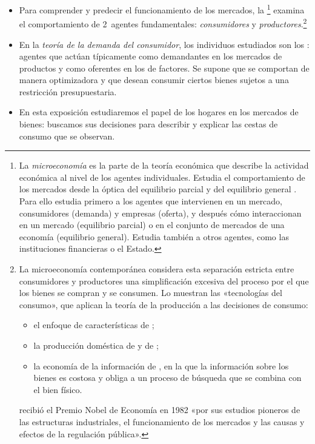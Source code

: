 \documentclass[11pt]{article}
\begin{document}
\begin{itemize}
\begin{itemize}
  \item Para comprender y predecir el funcionamiento de los mercados, la \footnote{La \emph{microeconomía} es la parte de la teoría económica que describe la actividad económica al nivel de los agentes individuales. Estudia el comportamiento de los mercados desde la óptica del equilibrio parcial  y del equilibrio general . Para ello estudia primero a los agentes que intervienen en un mercado, consumidores (demanda) y empresas (oferta), y después cómo interaccionan en un mercado (equilibrio parcial) o en el conjunto de mercados de una economía (equilibrio general). Estudia también a otros agentes, como las instituciones financieras o el Estado.} examina el comportamiento de 2~agentes fundamentales: \emph{consumidores} y \emph{productores}.\footnote{La microeconomía contemporánea considera esta separación estricta entre consumidores y productores una simplificación excesiva del proceso por el que los bienes se compran y se consumen\nocite{EkelundHebert2013History}. Lo muestran las «tecnologías del consumo», que aplican la teoría de la producción a las decisiones de consumo:
\begin{itemize}
\item el enfoque de características de \textcite{Lancaster1966New};
\item la producción doméstica de \textcite{Becker1965Allocation} y de \textcite{Gronau1977Leisure};
\item la economía de la información de \textcite{Stigler1961Information}, en la que la información sobre los bienes es costosa y obliga a un proceso de búsqueda que se combina con el bien físico.
\end{itemize}
 recibió el Premio Nobel de Economía en 1982 «por sus estudios pioneros de las estructuras industriales, el funcionamiento de los mercados y las causas y efectos de la regulación pública»\nocite{Nobel1982Stigler}.}
  \item En la \emph{teoría de la demanda del consumidor}, los individuos estudiados son los : agentes que actúan típicamente como demandantes en los mercados de productos y como oferentes en los de factores. Se supone que se comportan de manera optimizadora y que desean consumir ciertos bienes sujetos a una restricción presupuestaria.
  \item En esta exposición estudiaremos el papel de los hogares en los mercados de bienes: buscamos  sus decisiones para describir y explicar las cestas de consumo que se observan.
  \end{itemize}


\end{itemize}
\end{document}
